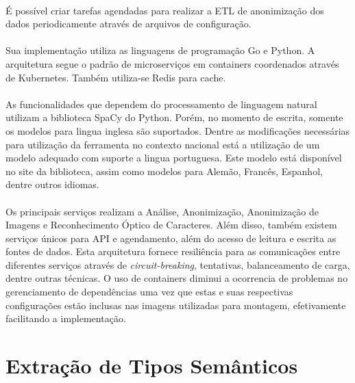 \paragraph{} É possível criar tarefas agendadas para realizar a ETL de anonimização dos dados periodicamente através de arquivos de configuração.

\paragraph{} Sua implementação utiliza as linguagens de programação Go e Python. A arquitetura segue o padrão de microserviços em containers coordenados através de Kubernetes. Também utiliza-se Redis para cache.

\paragraph{} As funcionalidades que dependem do processamento de linguagem natural utilizam a biblioteca SpaCy do Python. Porém, no momento de escrita, somente
os modelos para lingua inglesa são suportados.\cite{presidio-issue303} Dentre as modificações necessárias para utilização da ferramenta no contexto nacional está a utilização de um modelo
adequado com suporte a lingua portuguesa. Este modelo está disponível no site da biblioteca\cite{spacy}, assim como modelos para Alemão, Francês, Espanhol, dentre outros idiomas.

\paragraph{} Os principais serviços realizam a Análise, Anonimização, Anonimização de Imagens e Reconhecimento Óptico de Caracteres. 
Além disso, também existem serviços únicos para API e agendamento, além do acesso de leitura e escrita as fontes de dados. Esta arquitetura fornece resiliência para
as comunicações entre diferentes serviços através de \textit{circuit-breaking}, tentativas, balanceamento de carga, dentre outras técnicas. 
O uso de containers diminui a ocorrencia de problemas no gerenciamento de dependências\cite{merkel2014docker} uma vez que estas e suas respectivas configurações
estão inclusas nas imagens utilizadas para montagem, efetivamente facilitando a implementação.


\section{Extração de Tipos Semânticos}


